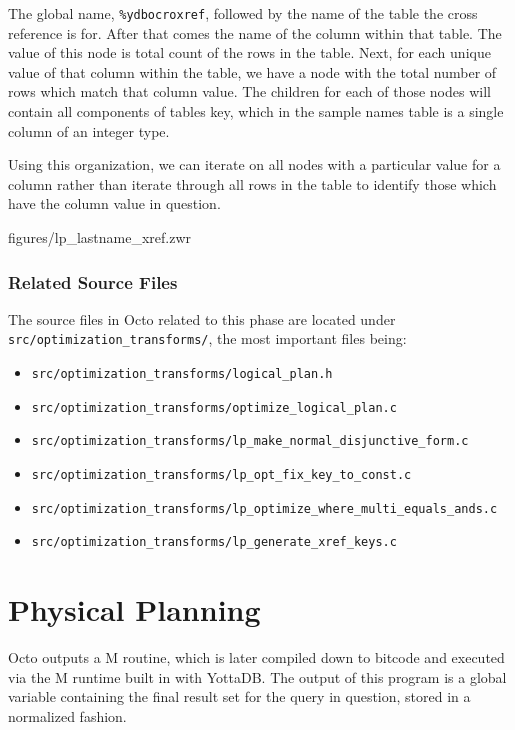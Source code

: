 \documentclass[]{article}
\def\code#1{\texttt{#1}}
\begin{document}
The global name, \code{\%ydbocroxref}, followed by the name of the table the cross reference is for.
After that comes the name of the column within that table.
The value of this node is total count of the rows in the table.
Next, for each unique value of that column within the table, we have a node with the total number of rows which match that column value.
The children for each of those nodes will contain all components of tables key, which in the sample names table is a single column of an integer type.

Using this organization, we can iterate on all nodes with a particular value for a column rather than iterate through all rows in the table to identify those which have the column value in question.


{figures/lp_lastname_xref.zwr}

\subsubsection{Related Source Files}

The source files in Octo related to this phase are located under \code{src/optimization\_transforms/}, the most important files being:

\begin{itemize}
	\item \code{src/optimization\_transforms/logical\_plan.h}
	\item \code{src/optimization\_transforms/optimize\_logical\_plan.c}
	\item \code{src/optimization\_transforms/lp\_make\_normal\_disjunctive\_form.c}
	\item \code{src/optimization\_transforms/lp\_opt\_fix\_key\_to\_const.c}
	\item \code{src/optimization\_transforms/lp\_optimize\_where\_multi\_equals\_ands.c}
	\item \code{src/optimization\_transforms/lp\_generate\_xref\_keys.c}
\end{itemize}

\section{Physical Planning} \label{sec:physical}

Octo outputs a M routine, which is later compiled down to bitcode and executed via the M runtime built in with YottaDB.
The output of this program is a global variable containing the final result set for the query in question, stored in a normalized fashion.
\end{document}
